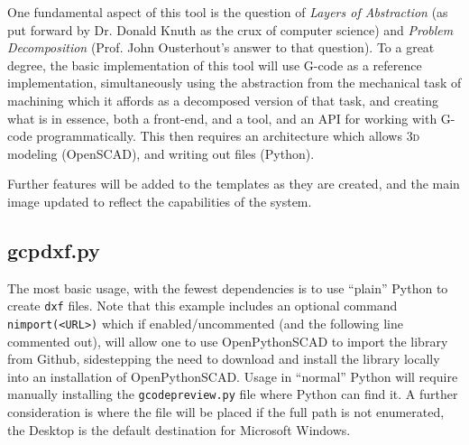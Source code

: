 \documentclass{ltxdoc}
\begin{document}
One fundamental aspect of this tool is the question of \emph{Layers of Abstraction} (as put forward by Dr. Donald Knuth as the crux of computer science) and \emph{Problem Decomposition} (Prof. John Ousterhout's answer to that question). To a great degree, the basic implementation of this tool will use G-code as a reference implementation, simultaneously using the abstraction from the mechanical task of machining which it affords as a decomposed version of that task, and creating what is in essence, both a front-end, and a tool, and an API for working with G-code programmatically. This then requires an architecture which allows \textsc{3d} modeling (OpenSCAD), and writing out files (Python).

Further features will be added to the templates as they are created, and the main image updated to reflect the capabilities of the system.

%
%
%
%
%

\subsection{gcpdxf.py}

The most basic usage, with the fewest dependencies is to use ``plain'' Python to create \verb|dxf| files. Note that this example includes an optional command \verb|nimport(<URL>)| which if enabled/uncommented (and the following line commented out), will allow one to use OpenPythonSCAD to import the library from Github, sidestepping the need to download and install the library locally into an installation of OpenPythonSCAD. Usage in  ``normal'' Python will require manually installing the \verb|gcodepreview.py| file where Python can find it. A further consideration is where the file will be placed if the full path is not enumerated, the Desktop is the default destination for Microsoft Windows.
\end{document}

